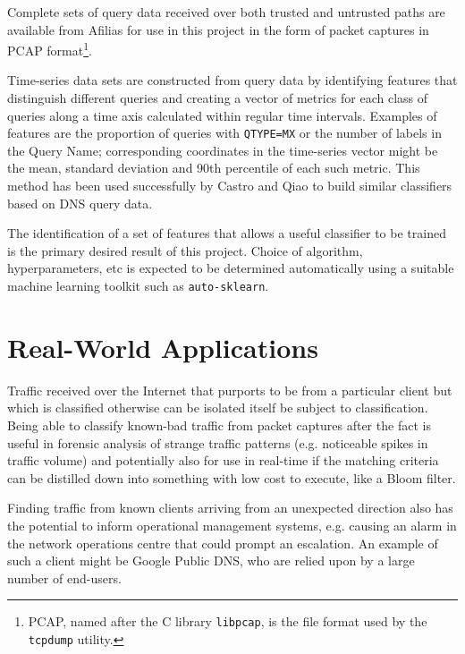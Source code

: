 \documentclass[9pt,letterpaper,twocolumn]{scrartcl}
\begin{document}
Complete sets of query data received over both trusted and untrusted
paths are available from Afilias for use in this project in the
form of packet captures in PCAP format\footnote{PCAP, named after
the C library \texttt{libpcap}, is the file format used by the
\texttt{tcpdump} utility.}.

Time-series data sets are constructed from query data by identifying
features that distinguish different queries and creating a vector
of metrics for each class of queries along a time axis calculated
within regular time intervals. Examples of features are the proportion
of queries with \texttt{QTYPE=MX} or the number of labels in the
Query Name; corresponding coordinates in the time-series vector
might be the mean, standard deviation and 90th percentile of each
such metric. This method has been used successfully by Castro and Qiao to
build similar classifiers based on DNS query data\cite{CastroQiao}.

The identification of a set of features that allows a useful
classifier to be trained is the primary desired result of this
project. Choice of algorithm, hyperparameters, etc is expected to
be determined automatically using a suitable machine learning toolkit
such as \texttt{auto-sklearn}\cite{NIPS2015_5872}.

\section{Real-World Applications}
Traffic received over the Internet that purports to be from a
particular client but which is classified otherwise can be isolated
itself be subject to classification. Being able to classify known-bad
traffic from packet captures after the fact is useful in forensic
analysis of strange traffic patterns (e.g. noticeable spikes in
traffic volume) and potentially also for use in real-time if the
matching criteria can be distilled down into something with low
cost to execute, like a Bloom filter.

Finding traffic from known clients arriving from an unexpected
direction also has the potential to inform operational management
systems, e.g. causing an alarm in the network operations centre
that could prompt an escalation. An example of such a client might
be Google Public DNS, who are relied upon by a large number of
end-users.



\end{document}
